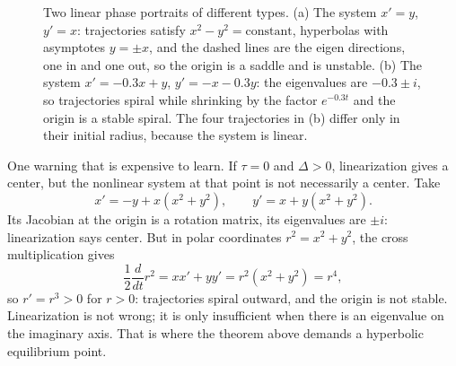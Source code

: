 \begin{figure}[htbp]
\centering
{}
\caption{Two linear phase portraits of different types. (a) The system
$x'=y$, $y'=x$: trajectories satisfy $x^{2}-y^{2}=\text{constant}$, hyperbolas
with asymptotes $y=\pm x$, and the dashed lines are the eigen directions, one in
and one out, so the origin is a saddle and is unstable. (b) The system $x'=-0.3x+y$, $y'=-x-0.3y$:
the eigenvalues are $-0.3\pm i$, so trajectories spiral while shrinking by the
factor $e^{-0.3t}$ and the origin is a stable spiral. The four trajectories in (b)
differ only in their initial radius, because the system is linear.}
\label{fig:potret-linear}
\end{figure}

One warning that is expensive to learn. If $\tau=0$ and $\Delta>0$, linearization gives a
center, but the nonlinear system at that point is not necessarily a center. Take
\[
x'=-y+x(x^{2}+y^{2}),\qquad y'=x+y(x^{2}+y^{2}).
\]
Its Jacobian at the origin is a rotation matrix, its eigenvalues are $\pm i$:
linearization says center. But in polar coordinates $r^{2}=x^{2}+y^{2}$,
the cross multiplication gives
\[
\frac{1}{2}\frac{d}{dt}r^{2}=xx'+yy'=r^{2}(x^{2}+y^{2})=r^{4},
\]
so $r'=r^{3}>0$ for $r>0$: trajectories spiral outward, and the origin is not
stable. Linearization is not wrong; it is only insufficient when there is an eigenvalue on
the imaginary axis. That is where the theorem above demands a hyperbolic equilibrium point.

